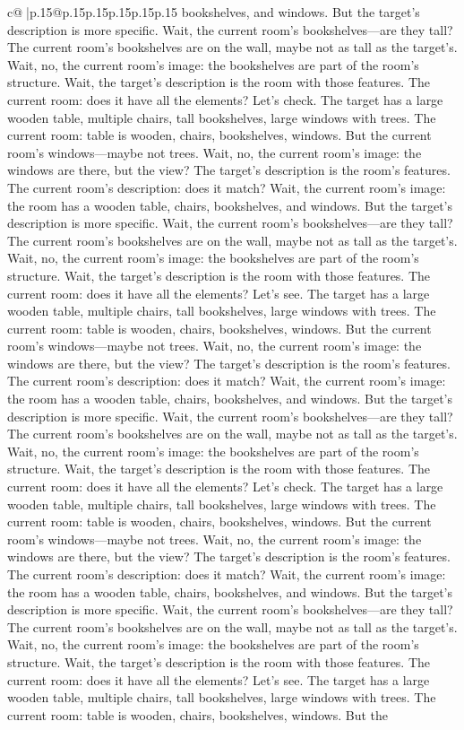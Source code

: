 \documentclass{article}
\begin{document}
{\begin{supertabular}{c@{$\;$}|p{.15\linewidth}@{}p{.15\linewidth}p{.15\linewidth}p{.15\linewidth}p{.15\linewidth}p{.15\linewidth}}
{{{bookshelves, and windows. But the target's description is more specific. Wait, the current room's bookshelves—are they tall? The current room's bookshelves are on the wall, maybe not as tall as the target's. Wait, no, the current room's image: the bookshelves are part of the room's structure. Wait, the target's description is the room with those features. The current room: does it have all the elements? Let's check. The target has a large wooden table, multiple chairs, tall bookshelves, large windows with trees. The current room: table is wooden, chairs, bookshelves, windows. But the current room's windows—maybe not trees. Wait, no, the current room's image: the windows are there, but the view? The target's description is the room's features. The current room's description: does it match? Wait, the current room's image: the room has a wooden table, chairs, bookshelves, and windows. But the target's description is more specific. Wait, the current room's bookshelves—are they tall? The current room's bookshelves are on the wall, maybe not as tall as the target's. Wait, no, the current room's image: the bookshelves are part of the room's structure. Wait, the target's description is the room with those features. The current room: does it have all the elements? Let's see. The target has a large wooden table, multiple chairs, tall bookshelves, large windows with trees. The current room: table is wooden, chairs, bookshelves, windows. But the current room's windows—maybe not trees. Wait, no, the current room's image: the windows are there, but the view? The target's description is the room's features. The current room's description: does it match? Wait, the current room's image: the room has a wooden table, chairs, bookshelves, and windows. But the target's description is more specific. Wait, the current room's bookshelves—are they tall? The current room's bookshelves are on the wall, maybe not as tall as the target's. Wait, no, the current room's image: the bookshelves are part of the room's structure. Wait, the target's description is the room with those features. The current room: does it have all the elements? Let's check. The target has a large wooden table, multiple chairs, tall bookshelves, large windows with trees. The current room: table is wooden, chairs, bookshelves, windows. But the current room's windows—maybe not trees. Wait, no, the current room's image: the windows are there, but the view? The target's description is the room's features. The current room's description: does it match? Wait, the current room's image: the room has a wooden table, chairs, bookshelves, and windows. But the target's description is more specific. Wait, the current room's bookshelves—are they tall? The current room's bookshelves are on the wall, maybe not as tall as the target's. Wait, no, the current room's image: the bookshelves are part of the room's structure. Wait, the target's description is the room with those features. The current room: does it have all the elements? Let's see. The target has a large wooden table, multiple chairs, tall bookshelves, large windows with trees. The current room: table is wooden, chairs, bookshelves, windows. But the }}}
\end{supertabular}}
\end{document}
